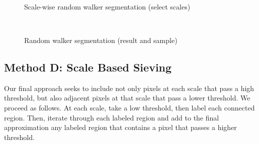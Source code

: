 \begin{figure}[p] \centering
  \\[-0.5cm]
  \\[-0.5cm]
  \\[-0.5cm]
\caption{Scale-wise random walker segmentation (select scales)}
  \label{fig:rw-demo-scalewise}
\end{figure}
 
 
\begin{figure} \centering
  \\[-0.5cm]
  \caption{Random walker segmentation (result and sample)}
  \label{fig:rw-demo-merged}
\end{figure}

 \subsection{Method D: Scale Based Sieving}
   
  Our final approach seeks to include not only pixels at each scale that pass a high threshold, but also adjacent pixels at that scale that pass a lower threshold. We proceed as follows. At each scale, take a low threshold, then label each connected region. Then, iterate through each labeled region and add to the final approximation any labeled region that contains a pixel that passes a higher threshold.